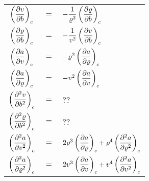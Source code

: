 {\setlength{\tabcolsep}{.2em}
\begin{tabularx}{\linewidth}{ccl}
\toprule
$\der{v}{b}{c}$ & $=$ & $-\dfrac{1}{\varrho^2} \der{\varrho}{b}{c}$ \\[12pt]
$\der{\varrho}{b}{c}$ & $=$ & $-\dfrac{1}{v^2} \der{v}{b}{c}$ \\
\midrule
$\der{a}{v}{c}$ & $=$ & $-\varrho^2 \der{a}{\varrho}{c}$ \\[12pt]
$\der{a}{\varrho}{c}$ & $=$ & $-v^2 \der{a}{v}{c}$ \\
\midrule
$\der{^2 v}{b^2}{c}$ & $=$ & $??$ \\[12pt]
$\der{^2 \varrho}{b^2}{c}$ & $=$ & $??$ \\
\midrule
$\der{^2 a}{v^2}{c}$ & $=$ & $2\varrho^3 \der{a}{\varrho}{c} + \varrho^4 \der{^2 a}{\varrho^2}{c}$ \\[12pt]
$\der{^2 a}{\varrho^2}{c}$ & $=$ & $2v^3 \der{a}{v}{c} + v^4 \der{^2 a}{v^2}{c}$ \\
\bottomrule
\end{tabularx}%
}